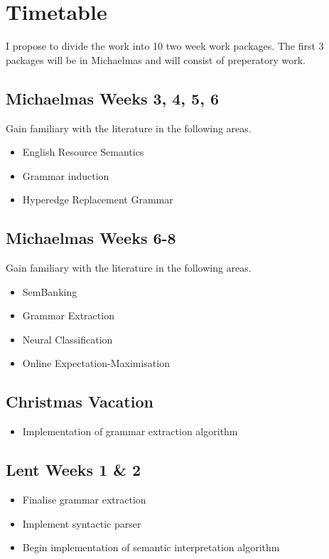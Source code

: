 \documentclass{article}
\begin{document}
\section{Timetable}

I propose to divide the work into 10 two week work packages. The first 3 packages will be in Michaelmas and will consist of preperatory work.

\subsection*{Michaelmas Weeks 3, 4, 5, 6}
Gain familiary with the literature in the following areas.
\begin{itemize}
    \item English Resource Semantics
    \item Grammar induction
    \item Hyperedge Replacement Grammar
\end{itemize}


\subsection*{Michaelmas Weeks 6-8}
Gain familiary with the literature in the following areas.
\begin{itemize}
    \item SemBanking
    \item Grammar Extraction
    \item Neural Classification
    \item Online Expectation-Maximisation
\end{itemize} 

\subsection*{Christmas Vacation}
\begin{itemize}
    \item Implementation of grammar extraction algorithm
\end{itemize}

\subsection*{Lent Weeks 1 \& 2}
\begin{itemize}
    \item Finalise grammar extraction
    \item Implement syntactic parser
    \item Begin implementation of semantic interpretation algorithm
\end{itemize}
\end{document}
